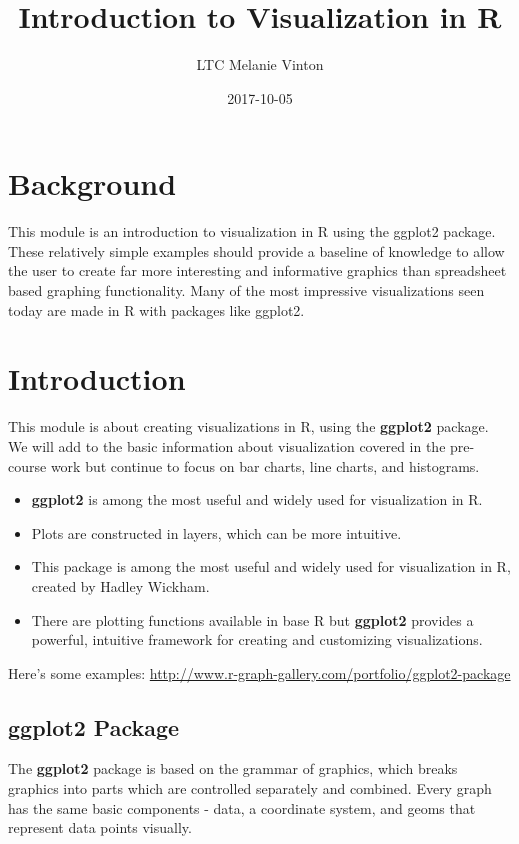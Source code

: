 \documentclass[]{book}
\title{Introduction to Visualization in R}
\author{LTC Melanie Vinton}
\date{2017-10-05}
\theoremstyle{definition}
\theoremstyle{definition}
\theoremstyle{remark}
\begin{document}
\maketitle

{
\setcounter{tocdepth}{1}
\tableofcontents
}
\chapter{Background}\label{background}

This module is an introduction to visualization in R using the ggplot2
package. These relatively simple examples should provide a baseline of
knowledge to allow the user to create far more interesting and
informative graphics than spreadsheet based graphing functionality. Many
of the most impressive visualizations seen today are made in R with
packages like ggplot2.

\chapter{Introduction}\label{introduction}

This module is about creating visualizations in R, using the
\textbf{ggplot2} package. We will add to the basic information about
visualization covered in the pre-course work but continue to focus on
bar charts, line charts, and histograms.

\begin{itemize}
\item
  \textbf{ggplot2} is among the most useful and widely used for
  visualization in R.
\item
  Plots are constructed in layers, which can be more intuitive.
\item
  This package is among the most useful and widely used for
  visualization in R, created by Hadley Wickham.
\item
  There are plotting functions available in base R but \textbf{ggplot2}
  provides a powerful, intuitive framework for creating and customizing
  visualizations.
\end{itemize}

Here's some examples:
\url{http://www.r-graph-gallery.com/portfolio/ggplot2-package}

\section{ggplot2 Package}\label{ggplot2-package}

The \textbf{ggplot2} package is based on the grammar of graphics, which
breaks graphics into parts which are controlled separately and combined.
Every graph has the same basic components - data, a coordinate system,
and geoms that represent data points visually.
\end{document}
